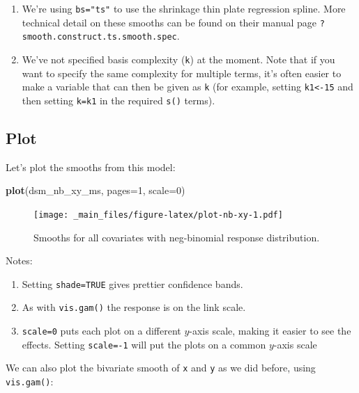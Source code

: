 \documentclass[]{book}
\newenvironment{Shaded}{\begin{snugshade}}{\end{snugshade}}
\newcommand{\KeywordTok}[1]{\textcolor[rgb]{0.13,0.29,0.53}{\textbf{#1}}}
\newcommand{\DataTypeTok}[1]{\textcolor[rgb]{0.13,0.29,0.53}{#1}}
\newcommand{\DecValTok}[1]{\textcolor[rgb]{0.00,0.00,0.81}{#1}}
\newcommand{\NormalTok}[1]{#1}
\providecommand{\tightlist}{%
  \setlength{\itemsep}{0pt}\setlength{\parskip}{0pt}}
\theoremstyle{definition}
\theoremstyle{definition}
\theoremstyle{remark}
\begin{document}
\begin{enumerate}
\def\labelenumi{\arabic{enumi}.}
\tightlist
\item
  We're using \texttt{bs="ts"} to use the shrinkage thin plate
  regression spline. More technical detail on these smooths can be found
  on their manual page \texttt{?smooth.construct.ts.smooth.spec}.
\item
  We've not specified basis complexity (\texttt{k}) at the moment. Note
  that if you want to specify the same complexity for multiple terms,
  it's often easier to make a variable that can then be given as
  \texttt{k} (for example, setting \texttt{k1\textless{}-15} and then
  setting \texttt{k=k1} in the required \texttt{s()} terms).
\end{enumerate}

\subsection{Plot}\label{plot}

Let's plot the smooths from this model:

\begin{Shaded}
\begin{Highlighting}[]
\KeywordTok{plot}\NormalTok{(dsm_nb_xy_ms, }\DataTypeTok{pages=}\DecValTok{1}\NormalTok{, }\DataTypeTok{scale=}\DecValTok{0}\NormalTok{)}
\end{Highlighting}
\end{Shaded}

\begin{figure}
\centering
\texttt{[image: \_main\_files/figure-latex/plot-nb-xy-1.pdf]}
\caption{\label{fig:plot-nb-xy}Smooths for all covariates with neg-binomial
response distribution.}
\end{figure}

Notes:

\begin{enumerate}
\def\labelenumi{\arabic{enumi}.}
\tightlist
\item
  Setting \texttt{shade=TRUE} gives prettier confidence bands.
\item
  As with \texttt{vis.gam()} the response is on the link scale.
\item
  \texttt{scale=0} puts each plot on a different \(y\)-axis scale,
  making it easier to see the effects. Setting \texttt{scale=-1} will
  put the plots on a common \(y\)-axis scale
\end{enumerate}

We can also plot the bivariate smooth of \texttt{x} and \texttt{y} as we
did before, using \texttt{vis.gam()}:
\end{document}
